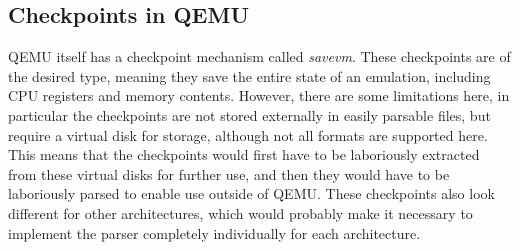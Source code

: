\subsection{Checkpoints in QEMU}
QEMU itself has a checkpoint mechanism called \emph{savevm}.
These checkpoints are of the desired type, meaning they save the entire state of an emulation,
including CPU registers and memory contents.
However, there are some limitations here, in particular the checkpoints are not stored externally in easily parsable files,
but require a virtual disk for storage, although not all formats are supported here.
This means that the checkpoints would first have to be laboriously extracted from these virtual disks for further use,
and then they would have to be laboriously parsed to enable use outside of QEMU.
These checkpoints also look different for other architectures, which would probably make it necessary
to implement the parser completely individually for each architecture.
